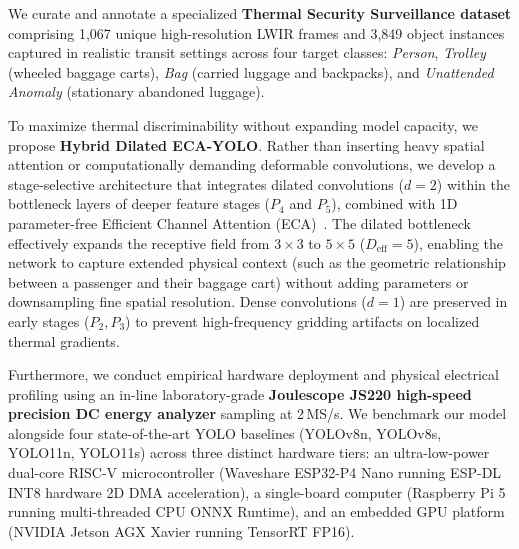 \documentclass[journal,twoside,web]{ieeecolor}
\begin{document}
We curate and annotate a specialized \textbf{Thermal Security Surveillance dataset} comprising 1,067 unique high-resolution LWIR frames and 3,849 object instances captured in realistic transit settings across four target classes: \textit{Person}, \textit{Trolley} (wheeled baggage carts), \textit{Bag} (carried luggage and backpacks), and \textit{Unattended Anomaly} (stationary abandoned luggage).

To maximize thermal discriminability without expanding model capacity, we propose \textbf{Hybrid Dilated ECA-YOLO}. Rather than inserting heavy spatial attention or computationally demanding deformable convolutions, we develop a stage-selective architecture that integrates dilated convolutions ($d=2$) within the bottleneck layers of deeper feature stages ($P_4$ and $P_5$), combined with 1D parameter-free Efficient Channel Attention (ECA)~\cite{wang2020eca}. The dilated bottleneck effectively expands the receptive field from $3\times3$ to $5\times5$ ($D_{\text{eff}}=5$), enabling the network to capture extended physical context (such as the geometric relationship between a passenger and their baggage cart) without adding parameters or downsampling fine spatial resolution. Dense convolutions ($d=1$) are preserved in early stages ($P_2, P_3$) to prevent high-frequency gridding artifacts on localized thermal gradients.

Furthermore, we conduct empirical hardware deployment and physical electrical profiling using an in-line laboratory-grade \textbf{Joulescope JS220 high-speed precision DC energy analyzer} sampling at 2\,MS/s. We benchmark our model alongside four state-of-the-art YOLO baselines (YOLOv8n, YOLOv8s, YOLO11n, YOLO11s) across three distinct hardware tiers: an ultra-low-power dual-core RISC-V microcontroller (Waveshare ESP32-P4 Nano running ESP-DL INT8 hardware 2D DMA acceleration), a single-board computer (Raspberry Pi 5 running multi-threaded CPU ONNX Runtime), and an embedded GPU platform (NVIDIA Jetson AGX Xavier running TensorRT FP16).
\end{document}
